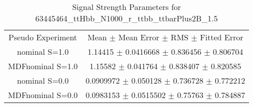 \begin{table}
\centering
\caption{Signal Strength Parameters for 63445464\_ttHbb\_N1000\_r\_ttbb\_ttbarPlus2B\_1.5}
\begin{tabular}{cc}
\toprule
Pseudo Experiment & Mean $\pm$ Mean Error $\pm$ RMS $\pm$ Fitted Error\\
nominal S=1.0 & \num{1.14415} $\pm$ \num{0.0416668} $\pm$ \num{0.836456} $\pm$ \num{0.806704}\\
MDFnominal S=1.0 & \num{1.15582} $\pm$ \num{0.041764} $\pm$ \num{0.838407} $\pm$ \num{0.820585}\\
nominal S=0.0 & \num{0.0909972} $\pm$ \num{0.050128} $\pm$ \num{0.736728} $\pm$ \num{0.772212}\\
MDFnominal S=0.0 & \num{0.0983153} $\pm$ \num{0.0515502} $\pm$ \num{0.75763} $\pm$ \num{0.784887}\\
\bottomrule
\end{tabular}
\end{table}